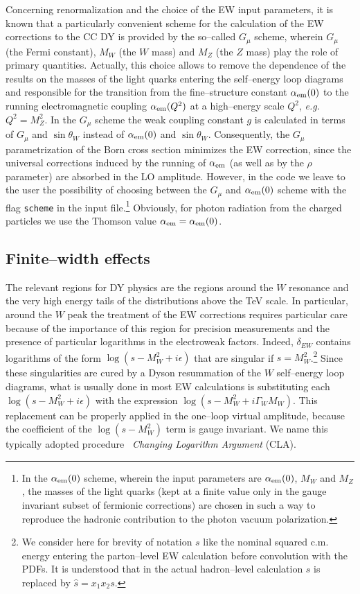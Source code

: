 \documentclass[11pt,a4paper]{article}
\newcommand\aem{\alpha_{\rm em}}
\begin{document}
Concerning renormalization and the choice of the EW input parameters,
it is known that a particularly convenient scheme for the calculation
of the EW corrections to the CC DY is provided by the so--called
$G_\mu$ scheme, wherein $G_\mu$ (the Fermi constant), $M_W$ (the $W$
mass) and $M_Z$ (the $Z$ mass) play the role of primary quantities.
Actually, this choice allows to remove the dependence of the results
on the masses of the light quarks entering the self--energy loop
diagrams and responsible for the transition from the fine--structure
constant $\aem(0)$ to the running electromagnetic coupling
$\aem(Q^2)$ at a high--energy scale $Q^2$, {\it e.g.} $Q^2 = M_Z^2$. In the
$G_\mu$ scheme the weak coupling constant $g$ is calculated in terms
of $G_\mu$ and $\sin\theta_W$ instead of $\aem(0)$ and
$\sin\theta_W$.  Consequently, the $G_\mu$ parametrization of the Born
cross section minimizes the EW correction, since the universal
corrections induced by the running of $\aem$ (as well as by the
$\rho$ parameter) are absorbed in the LO amplitude. However, in the
code we leave to the user the possibility of choosing between the
$G_\mu$ and $\aem(0)$ scheme with the flag \texttt{scheme} in the
input file.\footnote{In the $\aem(0)$ scheme, wherein the input
  parameters are $\aem(0)$, $M_W$ and $M_Z$, the masses of the light
  quarks (kept at a finite value only in the gauge invariant subset of
  fermionic corrections) are chosen in such a way to reproduce the
  hadronic contribution to the photon vacuum polarization.} 
  Obviously, for photon radiation from the charged particles we use the
  Thomson value $\aem = \aem(0)$.
  
\subsection{Finite--width effects}
The relevant regions for DY physics are the regions around the $W$
resonance and the very high energy tails of the distributions above
the TeV scale. In particular, around the $W$ peak the treatment of the
EW corrections requires particular care because of the importance of
this region for precision measurements and the presence of particular
logarithms in the electroweak factors.
Indeed, $\delta_{EW}$ contains logarithms of the form $\log(s - M^2_W
+ i\epsilon)$ that are singular if $s = M_W^2$.\footnote{We consider
  here for brevity of notation $s$ like the nominal squared
  c.m. energy entering the parton--level EW calculation before
  convolution with the PDFs. It is understood that in the actual
  hadron--level calculation $s$ is replaced by $\hat{s} = x_1 x_2
  s$.} Since these singularities are cured by a Dyson resummation of
the $W$ self--energy loop diagrams, what is usually done in most EW
calculations is substituting each $\log(s - M^2_W + i\epsilon)$ with
the expression $\log(s-M^2_W + i\Gamma_W M_W)$.  This replacement can
be properly applied in the one--loop virtual amplitude, because the
coefficient of the $\log(s - M^2_W)$ term is gauge invariant. We name
this typically adopted procedure \cite{Dittmaier:2001ay,CarloniCalame:2006zq}~\emph{Changing Logarithm Argument}
(CLA).
\end{document}
